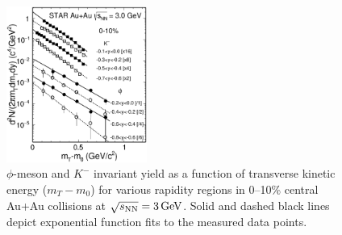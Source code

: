 \documentclass[%
 reprint,	
showpacs,
 amsmath,amssymb,
 aps,
 prc,
]{revtex4-1}
\begin{document}
\begin{figure}
\centering
\includegraphics[width=0.41\textwidth]{fig/fig2_h_mT_spectra_phiMeson.eps}
  \caption{ $\phi$-meson and $K^-$ invariant yield as a function of transverse kinetic energy ($m_T-m_0$) for various rapidity regions in 0--10\% central Au+Au collisions at ${\sqrt{s_{\rm NN}} = \rm{3\,GeV}}$. Solid and dashed black lines depict exponential function fits to the measured data points.}
\label{fig:phimTSpectra} 
\end{figure}
\end{document}
